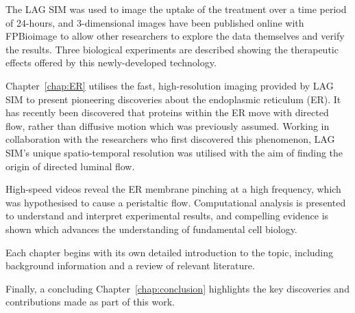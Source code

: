 The LAG SIM was used to image the uptake of the treatment over a time period of 24-hours, and 3-dimensional images have been published online with FPBioimage to allow other researchers to explore the data themselves and verify the results. 
Three biological experiments are described showing the therapeutic effects offered by this newly-developed technology. 

Chapter~\ref{chap:ER} utilises the fast, high-resolution imaging provided by LAG SIM to present pioneering discoveries about the endoplasmic reticulum (ER). 
It has recently been discovered that proteins within the ER move with directed flow, rather than diffusive motion which was previously assumed. 
Working in collaboration with the researchers who first discovered this phenomenon, LAG SIM's unique spatio-temporal resolution was utilised with the aim of finding the origin of directed luminal flow. 

High-speed videos reveal the ER membrane pinching at a high frequency, which was hypothesised to cause a peristaltic flow. 
Computational analysis is presented to understand and interpret experimental results, and compelling evidence is shown which advances the understanding of fundamental cell biology. 

Each chapter begins with its own detailed introduction to the topic, including background information and a review of relevant literature. 

Finally, a concluding Chapter~\ref{chap:conclusion} highlights the key discoveries and contributions made as part of this work.